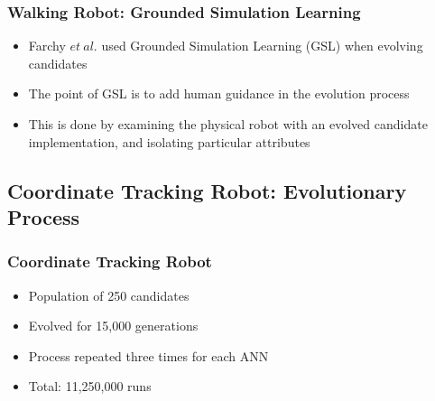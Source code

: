 \documentclass{beamer}
\begin{document}
\begin{frame}
\begin{frame}[fragile]
\end{frame}

\begin{frame}
  \frametitle{Walking Robot: Grounded Simulation Learning}
  \begin{itemize}
  \item Farchy $et~al.$ used Grounded Simulation Learning (GSL) when evolving candidates
  \item The point of GSL is to add human guidance in the evolution process
  \item This is done by examining the physical robot with an evolved candidate implementation, and isolating particular attributes
  \end{itemize}
\end{frame}

\subsection*{Coordinate Tracking Robot: Evolutionary Process}
\begin{frame}
  \frametitle{Coordinate Tracking Robot}
  \begin{itemize}
   \item Population of 250 candidates
   \item Evolved for 15,000 generations
   \item Process repeated three times for each ANN
   \item Total: 11,250,000 runs

  \end{itemize}
\end{frame}


\end{frame}
\end{document}
